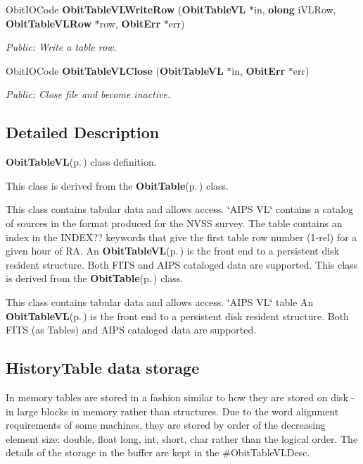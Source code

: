 \begin{CompactItemize}
Obit\-IOCode {\bf Obit\-Table\-VLWrite\-Row} ({\bf Obit\-Table\-VL} $\ast$in, {\bf olong} i\-VLRow, {\bf Obit\-Table\-VLRow} $\ast$row, {\bf Obit\-Err} $\ast$err)
\begin{CompactList}\small\item\em Public: Write a table row. \item\end{CompactList}\item 
Obit\-IOCode {\bf Obit\-Table\-VLClose} ({\bf Obit\-Table\-VL} $\ast$in, {\bf Obit\-Err} $\ast$err)
\begin{CompactList}\small\item\em Public: Close file and become inactive. \item\end{CompactList}\end{CompactItemize}


\subsection{Detailed Description}
{\bf Obit\-Table\-VL}{\rm (p.\,\pageref{structObitTableVL})} class definition. 

This class is derived from the {\bf Obit\-Table}{\rm (p.\,\pageref{structObitTable})} class.

This class contains tabular data and allows access. \char`\"{}AIPS VL\char`\"{} contains a catalog of sources in the format produced for the NVSS survey. The table contains an index in the INDEX?? keywords that give the first table row number (1-rel) for a given hour of RA. An {\bf Obit\-Table\-VL}{\rm (p.\,\pageref{structObitTableVL})} is the front end to a persistent disk resident structure. Both FITS and AIPS cataloged data are supported. This class is derived from the {\bf Obit\-Table}{\rm (p.\,\pageref{structObitTable})} class.

This class contains tabular data and allows access. \char`\"{}AIPS VL\char`\"{} table An {\bf Obit\-Table\-VL}{\rm (p.\,\pageref{structObitTableVL})} is the front end to a persistent disk resident structure. Both FITS (as Tables) and AIPS cataloged data are supported.\subsection{History\-Table data storage}\label{ObitTableWX_8h_TableDataStorage}
In memory tables are stored in a fashion similar to how they are stored on disk - in large blocks in memory rather than structures. Due to the word alignment requirements of some machines, they are stored by order of the decreasing element size: double, float long, int, short, char rather than the logical order. The details of the storage in the buffer are kept in the \#Obit\-Table\-VLDesc.

